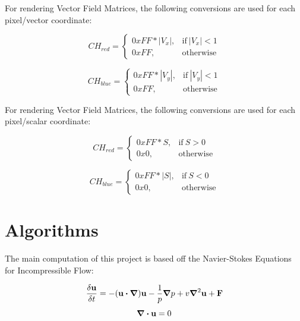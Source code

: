 \documentclass[
10pt, %
letterpaper, %
oneside, %
headinclude,footinclude, %
BCOR5mm, %
]{scrartcl}
\begin{document}
For rendering Vector Field Matrices, the following conversions are used for each pixel/vector coordinate:

\begin{equation}
    CH_{red} = \begin{cases}
        0xFF * |V_x|, & \text{if}\ |V_x| < 1 \\
        0xFF, & \text{otherwise}
    \end{cases}
\end{equation}

\begin{equation}
    CH_{blue} = \begin{cases}
        0xFF * |V_y|, & \text{if}\ |V_y| < 1 \\
        0xFF, & \text{otherwise}
    \end{cases}
\end{equation}

For rendering Vector Field Matrices, the following conversions are used for each pixel/scalar coordinate:

\begin{equation}
    CH_{red} = \begin{cases}
        0xFF * S, & \text{if}\ S > 0 \\
        0x0, & \text{otherwise}
    \end{cases}
\end{equation}

\begin{equation}
    CH_{blue} = \begin{cases}
        0xFF * |S|, & \text{if}\ S < 0 \\
        0x0, & \text{otherwise}
    \end{cases}
\end{equation}

\section{Algorithms} %
The main computation of this project is based off the Navier-Stokes Equations for Incompressible Flow:

\begin{equation}
    \frac{\delta \vb{u}}{\delta t} = - (\vb{u} \dotproduct \grad)\vb{u} - \frac{1}{p}\grad p + v \grad^2 \vb{u} + \vb{F}
\end{equation}
\begin{equation}
    \grad \dotproduct \vb{u} = 0
\end{equation}
\end{document}
